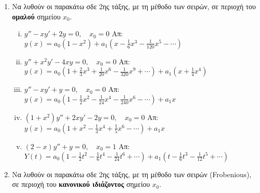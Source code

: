 



\usepackage{microtype} 
\thispagestyle{empty}



\begin{center}
\end{center}

\vspace{\baselineskip}

\begin{enumerate}
	\item  Να λυθούν οι παρακάτω σδε 2ης τάξης, με τη μέθοδο των σειρών, σε περιοχή του
		\textbf{ομαλού} σημείου $ x_{0} $. 

		\begin{enumerate}[i)]
			\item $ y'' - xy' + 2y = 0, \quad  x_{0} = 0 $ \hfill Απ: $ \scriptstyle{ y(x) =
				a_{0} \left(1 - x^{2}\right)} + a_{1} \left(x - \frac{1}{6}x^{3} - \frac{1}{120}x^{5} - \cdots \right) $ 

			\item $ y'' + x^{2}y' - 4xy = 0, \quad x_{0} = 0 $ \hfill Απ: $ \scriptstyle {y(x)
					= a_{0}\left(1 + \frac{2}{3} x^{3} + \frac{1}{20} x^{6} - \frac{1}{320} x^{9} +
				\cdots\right) + a_{1}\left(x + \frac{1}{4} x^{4}\right)} $  

			\item $ y'' - xy' + y = 0, \quad x_{0} = 0 $ \hfill Απ: $ \scriptstyle{ y(x) =
				a_{0}\left(1 - \frac{1}{2} x^{2} - \frac{1}{24} x^{4} - \frac{1}{240} x^{6} - \cdots\right)} + a_{1} x $ 

			\item $ (1+x^{2})y'' + 2xy' - 2y = 0, \quad x_{0} = 0  $ \hfill Απ:
				$ \scriptstyle{ y(x) = a_{0}\left(1 + x^{2} - \frac{1}{3} x^{4} + \frac{1}{5} x^{6} - \cdots\right) + a_{1} x }$  

			\item \label{eq:5} $ (2-x)y'' + y = 0, \quad x_{0} = 1$ \hfill Απ: $ \scriptstyle{ Y(t) = a_{0}\left(1 - \frac{1}{2} t^{2} - \frac{1}{6} t^{4} - \frac{1}{24} t^{6} +
				\cdots\right) + a_{1}\left(t - \frac{1}{6}t^{3} - \frac{1}{12}t^{5} + \cdots \right)}$ 
		\end{enumerate}

	\item Να λυθούν οι παρακάτω σδε 2ης τάξης, με τη μέθοδο των σειρών (\textlatin{Frobenious}),
		σε περιοχή του \textbf{κανονικού ιδιάζοντος} σημείου $ x_{0} $.


\end{enumerate}
